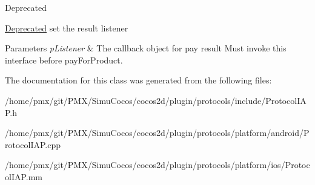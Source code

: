 \begin{DoxyRefDesc}{Deprecated}
\item[\hyperlink{deprecated__deprecated000232}{Deprecated}]set the result listener \end{DoxyRefDesc}

\begin{DoxyParams}{Parameters}
{\em p\+Listener} & The callback object for pay result  Must invoke this interface before pay\+For\+Product. \\
\hline
\end{DoxyParams}


The documentation for this class was generated from the following files\+:\begin{DoxyCompactItemize}
\item 
/home/pmx/git/\+P\+M\+X/\+Simu\+Cocos/cocos2d/plugin/protocols/include/Protocol\+I\+A\+P.\+h\item 
/home/pmx/git/\+P\+M\+X/\+Simu\+Cocos/cocos2d/plugin/protocols/platform/android/Protocol\+I\+A\+P.\+cpp\item 
/home/pmx/git/\+P\+M\+X/\+Simu\+Cocos/cocos2d/plugin/protocols/platform/ios/Protocol\+I\+A\+P.\+mm\end{DoxyCompactItemize}
